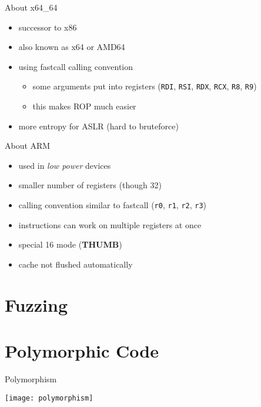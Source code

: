 \documentclass[beamer]{uibk}
\begin{document}
\begin{frame}{About x64\_64}
    \begin{itemize}
        \item successor to x86
        \item also known as x64 or AMD64
        \item using fastcall calling convention
            \begin{itemize}
                \item some arguments put into registers (\texttt{RDI},
                    \texttt{RSI}, \texttt{RDX}, \texttt{RCX}, \texttt{R8},
                    \texttt{R9})
                \item this makes ROP much easier
            \end{itemize}
        \item more entropy for ASLR (hard to bruteforce)
    \end{itemize}
\end{frame}

\begin{frame}{About ARM}
    \begin{itemize}
        \item used in \emph{low power} devices
        \item smaller number of registers (though \SI{32}{\bit})
        \item calling convention similar to fastcall (\texttt{r0}, \texttt{r1},
            \texttt{r2}, \texttt{r3})
        \item instructions can work on multiple registers at once
        \item special \SI{16}{\bit} mode (\textbf{THUMB})
        \item cache not flushed automatically
    \end{itemize}
\end{frame}

\section{Fuzzing}

\section{Polymorphic Code}

\begin{frame}{Polymorphism}
    \begin{center}
        \texttt{[image: polymorphism]}
    \end{center}
\end{frame}
\end{document}
